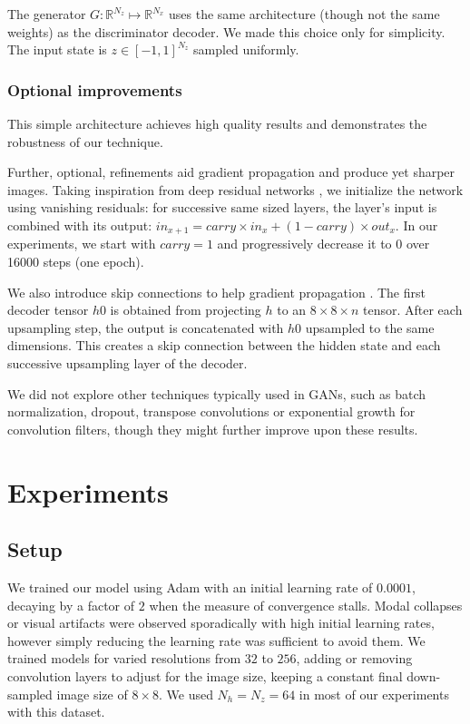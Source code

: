 \documentclass[english]{article}
\begin{document}
The generator $G:\mathbb{R}^{N_{z}}\mapsto\mathbb{R}^{N_{x}}$ uses
the same architecture (though not the same weights) as the discriminator
decoder. We made this choice only for simplicity. The input state
is $z\in\left[-1,1\right]^{N_{z}}$ sampled uniformly. 


\subsubsection{Optional improvements}

This simple architecture achieves high quality results and demonstrates
the robustness of our technique.

Further, optional, refinements aid gradient propagation and produce
yet sharper images. Taking inspiration from deep residual networks
\cite{he2016deep}, we initialize the network using vanishing residuals:
for successive same sized layers, the layer's input is combined with
its output: $in_{x+1}=carry\times in_{x}+(1-carry)\times out_{x}$.
In our experiments, we start with $carry=1$ and progressively decrease
it to 0 over 16000 steps (one epoch). 

We also introduce skip connections \cite{he2016deep,srivastava2015highway,huang2016densely}
to help gradient propagation \cite{bengio1994learning}. The first
decoder tensor $h0$ is obtained from projecting $h$ to an $8\times8\times n$
tensor. After each upsampling step, the output is concatenated with
$h0$ upsampled to the same dimensions. This creates a skip connection
between the hidden state and each successive upsampling layer of the
decoder.

We did not explore other techniques typically used in GANs, such as
batch normalization, dropout, transpose convolutions or exponential
growth for convolution filters, though they might further improve
upon these results. 


\section{Experiments}


\subsection{Setup}

We trained our model using Adam with an initial learning rate of $0.0001$,
decaying by a factor of $2$ when the measure of convergence stalls.
Modal collapses or visual artifacts were observed sporadically with
high initial learning rates, however simply reducing the learning
rate was sufficient to avoid them. We trained models for varied resolutions
from $32$ to $256$, adding or removing convolution layers to adjust
for the image size, keeping a constant final down-sampled image size
of $8\times8$. We used $N_{h}=N_{z}=64$ in most of our experiments
with this dataset.
\end{document}
